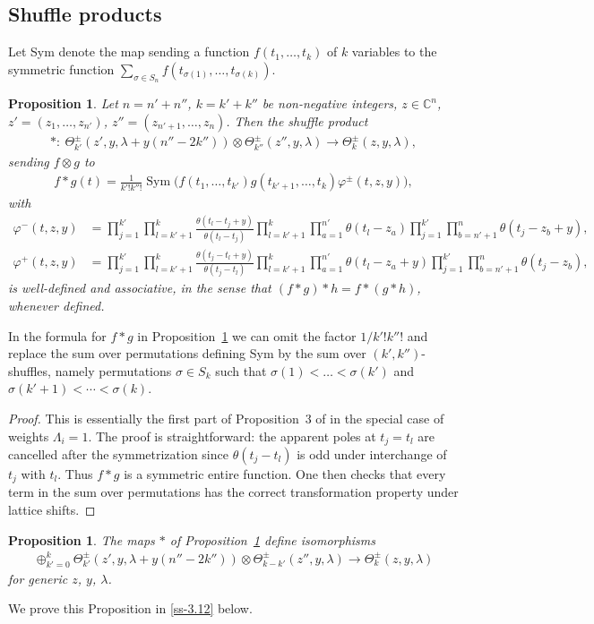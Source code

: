 \documentclass[10pt,a4paper]{amsart}
\numberwithin{equation}{section}
\newtheorem{Proposition}[Theorem]{Proposition}
 { \theoremstyle{definition}
\newtheorem{Definition}[Theorem]{Definition}
\newtheorem{Example}[Theorem]{Example}
\newtheorem{Remark}[Theorem]{Remark} }
\begin{document}
\subsection{Shuffle products}\label{ss-3.2}
Let Sym denote the map sending a function $f(t_1,\dots,t_k)$ of $k$ variables to the symmetric function $\sum\limits_{\sigma\in S_n}f(t_{\sigma(1)},\dots,t_{\sigma(k)})$.
\begin{Proposition}\label{prop-0} Let $n=n'+n''$, $k=k'+k''$ be non-negative integers, $z\in\mathbb C^n$, $z'=(z_1,\dots,z_{n'})$, $z''=(z_{n'+1},\dots, z_n)$. Then the shuffle product
 \begin{gather*}
 *\colon \ \Theta^\pm_{k'}(z',y,\lambda+y(n''-2k''))\otimes \Theta^\pm_{k''}(z'',y,\lambda)\to\Theta^\pm_k(z,y,\lambda),
 \end{gather*}
 sending $f\otimes g$ to
 \begin{gather*}
 f*g(t)=\frac1{k'!k''!} \operatorname{Sym}\big(f(t_1,\dots,t_{k'}) g(t_{k'+1},\dots,t_k)\varphi^\pm(t,z,y)\big),
 \end{gather*}
 with
 \begin{align*}
 \varphi^-(t,z,y)&=\prod_{j=1}^{k'} \prod_{l=k'+1}^k \frac{\theta(t_l-t_j+y)} {\theta(t_l-t_j)} \prod_{l=k'+1}^k\prod_{a=1}^{n'}\theta(t_l-z_a) \prod_{j=1}^{k'}\prod_{b=n'+1}^n\theta(t_j-z_b+y), \\
 \varphi^+(t,z,y)&=\prod_{j=1}^{k'} \prod_{l=k'+1}^k \frac{\theta(t_j-t_l+y)}{\theta(t_j-t_l)} \prod_{l=k'+1}^k\prod_{a=1}^{n'}\theta(t_l-z_a+y) \prod_{j=1}^{k'}\prod_{b=n'+1}^n\theta(t_j-z_b),
 \end{align*}
 is well-defined and associative, in the sense that $(f*g)*h=f*(g*h)$, whenever defined.
\end{Proposition}
\begin{Remark}\label{remark-3} In the formula for $f*g$ in Proposition~\ref{prop-0} we can omit the factor $1/k'!k''!$ and replace the sum over permutations defining Sym by the sum over $(k',k'')$-shuffles, namely permutations $\sigma\in S_{k}$ such that $\sigma(1)<\dots<\sigma(k')$ and $\sigma(k'+1)<\cdots<\sigma(k)$.
\end{Remark}
\begin{proof} This is essentially the first part of Proposition~3 of \cite{FelderTarasovVarchenko1997} in the special case of weights $\Lambda_i=1$. The proof is straightforward: the apparent poles at $t_j=t_l$ are cancelled after the symmetrization since $\theta(t_j-t_l)$ is odd under interchange of $t_j$ with $t_l$. Thus $f*g$ is a symmetric entire function. One then checks that every term in the sum over permutations has the correct transformation property under lattice shifts.
\end{proof}
\begin{Proposition}\label{prop-1} The maps $*$ of Proposition~{\rm \ref{prop-0}} define isomorphisms
 \begin{gather*}
 \oplus_{k'=0}^k \Theta^\pm_{k'}(z',y,\lambda+y(n''-2k'')) \otimes \Theta^\pm_{k-k'}(z'',y,\lambda) \to \Theta^\pm_k(z,y,\lambda)
 \end{gather*}
 for generic $z$, $y$, $\lambda$.
\end{Proposition}
We prove this Proposition in \ref{ss-3.12} below.
\end{document}
